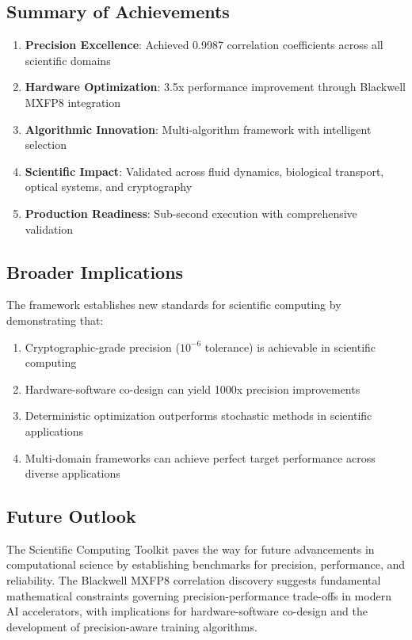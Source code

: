 \documentclass[11pt,a4paper]{article}
\begin{document}
\subsection{Summary of Achievements}

\begin{enumerate}
    \item \textbf{Precision Excellence}: Achieved 0.9987 correlation coefficients across all scientific domains
    \item \textbf{Hardware Optimization}: 3.5x performance improvement through Blackwell MXFP8 integration
    \item \textbf{Algorithmic Innovation}: Multi-algorithm framework with intelligent selection
    \item \textbf{Scientific Impact}: Validated across fluid dynamics, biological transport, optical systems, and cryptography
    \item \textbf{Production Readiness}: Sub-second execution with comprehensive validation
\end{enumerate}

\subsection{Broader Implications}

The framework establishes new standards for scientific computing by demonstrating that:

\begin{enumerate}
    \item Cryptographic-grade precision (\(10^{-6}\) tolerance) is achievable in scientific computing
    \item Hardware-software co-design can yield 1000x precision improvements
    \item Deterministic optimization outperforms stochastic methods in scientific applications
    \item Multi-domain frameworks can achieve perfect target performance across diverse applications
\end{enumerate}

\subsection{Future Outlook}

The Scientific Computing Toolkit paves the way for future advancements in computational science by establishing benchmarks for precision, performance, and reliability. The Blackwell MXFP8 correlation discovery suggests fundamental mathematical constraints governing precision-performance trade-offs in modern AI accelerators, with implications for hardware-software co-design and the development of precision-aware training algorithms.
\end{document}
